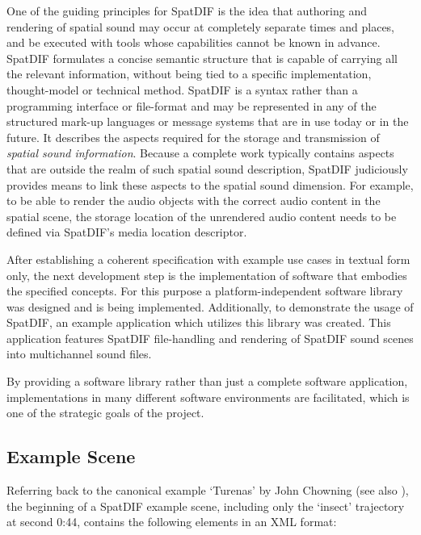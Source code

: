 \documentclass[a4paper]{article}
\begin{document}
One of the guiding principles for SpatDIF is the idea that authoring and rendering of spatial sound may occur at completely separate times and places, and be executed with tools whose capabilities cannot be known in advance. 
SpatDIF formulates a concise semantic structure that is capable of carrying all the relevant information, without being tied to a specific implementation, thought-model or technical method. 
SpatDIF is a syntax rather than a programming interface or file-format and may be represented in any of the structured mark-up languages or message systems that are in use today or in the future. 
It describes the aspects required for the storage and transmission of \emph{spatial sound information}.
Because a complete work typically contains aspects that are outside the realm of such spatial sound description, SpatDIF judiciously provides means to link these aspects to the spatial sound dimension.
For example, to be able to render the audio objects with the correct audio content in the spatial scene, the storage location of the unrendered audio content needs to be defined via SpatDIF's media location descriptor.

After establishing a coherent specification with example use cases in textual form only, the next development step is the implementation of software that embodies the specified concepts.
For this purpose a platform-independent software library was designed and is being implemented. 
Additionally, to demonstrate the usage of SpatDIF, an example application which utilizes this library was created. This application features SpatDIF file-handling and  rendering of SpatDIF sound scenes into multichannel sound files.

By providing a software library rather than just a complete software application, implementations in many different software environments are facilitated, which is one of the strategic goals of the project.

\subsection{Example Scene}
 
Referring back to the canonical example `Turenas' by John Chowning (see also \cite{Peters:2013SpatDifCMJ}), the beginning of a SpatDIF example scene, including only the `insect' trajectory at second 0:44, contains the following elements in an XML format:

 
\end{document}

